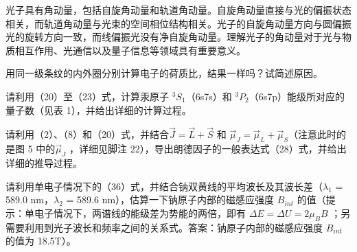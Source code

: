 \documentclass[dvipsnames, svgnames,a4paper,11pt]{article}
\begin{document}
	光子具有角动量，包括自旋角动量和轨道角动量。自旋角动量直接与光的偏振状态相关，而轨道角动量与光束的空间相位结构相关。光子的自旋角动量方向与圆偏振光的旋转方向一致，而线偏振光没有净自旋角动量。理解光子的角动量对于光与物质相互作用、光通信以及量子信息等领域具有重要意义。





\begin{question}
	用同一级条纹的内外圈分别计算电子的荷质比，结果一样吗？试简述原因。
\end{question}







\begin{question}
	请利用（20）至（23）式，计算汞原子 $^3S_1$（6s7s）和 $^3P_2$（6s7p）能级所对应的量子数（见表 1），并给出详细的计算过程。
\end{question}

		


\begin{question}
	请利用（2）、（8）和（20）式，并结合$\vec{J} = \vec{L} + \vec{S}$ 和 $\vec{\mu}_J = \vec{\mu}_L + \vec{\mu}_S $（注意此时的是图 5 中的$\vec{\mu}_J$ ，详细见脚注 22），导出朗德因子的一般表达式（28）式，并给出详细的推导过程。
\end{question}

	

\clearpage

\begin{question}
	请利用单电子情况下的（36）式，并结合钠双黄线的平均波长及其波长差（$\lambda_1$ = 589.0 nm，$\lambda_2$  = 589.6 nm），估算一下钠原子内部的磁感应强度 $B_{int}$ 的值（提示：单电子情况下，两谱线的能级差为势能的两倍，即有 $\Delta E = \Delta U =2 \mu_B B$ ；另需要利用到光子波长和频率之间的关系式。答案：钠原子内部的磁感应强度 $B_{int}$ 的值为 18.5T）。
\end{question}
\end{document}

